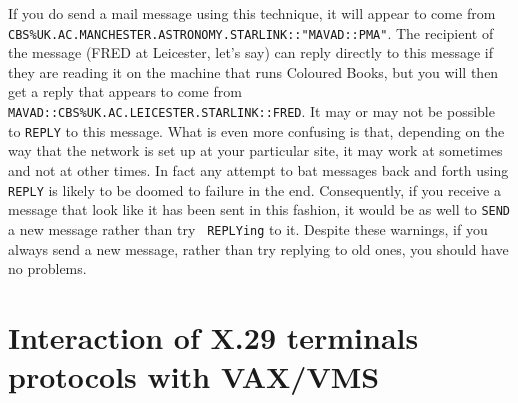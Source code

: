If you do send a mail message using this technique, it will appear to come from
{\tt CBS\%UK.AC.\-MANCHESTER.\-ASTRONOMY.\-STARLINK::"MAVAD::PMA"}. The
recipient of the message (FRED at Leicester, let's say) can reply directly to
this message if they are reading it on the machine that runs Coloured Books,
but you will then get a reply that appears to come from {\tt
MAVAD::CBS\%UK.AC.\-LEICESTER.\-STARLINK::FRED}.  It may or may not be possible
to {\tt REPLY} to this message. What is even more confusing is that, depending
on the way that the network is set up at your particular site, it may work at
sometimes and not at other times. In fact any attempt to bat messages back and
forth using {\tt REPLY} is likely to be doomed to failure in the end.
Consequently, if you receive a message that look like it has been sent in this
fashion, it would be as well to {\tt SEND} a new message rather than try {\tt
REPLYing} to it. Despite these warnings, if you always send a new message,
rather than try replying to old ones, you should have no problems.

\section{Interaction of X.29 terminals protocols with VAX/VMS}
\label{pad}

